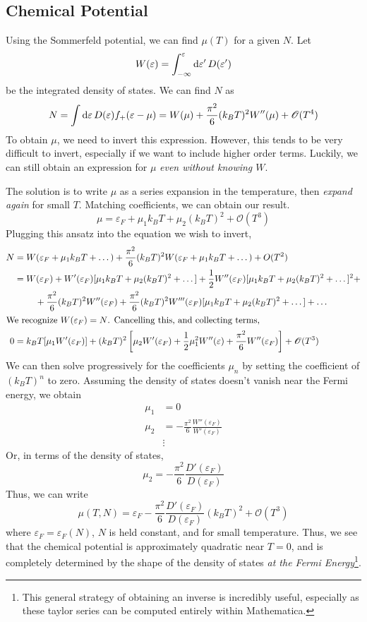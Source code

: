 \subsection{Chemical Potential}
Using the Sommerfeld potential, we can find \(\mu(T)\) for a given \(N\). Let
\[W(\varepsilon) = \int_{-\infty}^\varepsilon \d{\varepsilon'}D(\varepsilon')\]
be the integrated density of states. We can find \(N\) as
\[N = \int\d{\varepsilon}D(\varepsilon)f_+(\varepsilon-\mu) = W(\mu) + \frac{\pi^2}{6}(k_BT)^2W''(\mu)+\mathscr{O}(T^4)\]
To obtain \(\mu\), we need to invert this expression. However, this tends to be very difficult to invert, especially if we want to include higher order terms. Luckily, we can still obtain an expression for \(\mu\) \emph{even without knowing \(W\)}.

The solution is to write \(\mu\) as a series expansion in the temperature, then \emph{expand again} for small \(T\). Matching coefficients, we can obtain our result. 
\[\mu = \varepsilon_F + \mu_1 k_BT + \mu_2 (k_BT)^2 + \mathscr{O}(T^3)\]
Plugging this ansatz into the equation we wish to invert, \hfuzz=1cm
\begin{align*}
	N&= W(\varepsilon_F+\mu_1k_BT+\dots)+\frac{\pi^2}{6}(k_BT)^2W(\varepsilon_F+\mu_1k_BT+\dots)+O(T^2)\\
	 &=W(\varepsilon_F) + W'(\varepsilon_F)[\mu_1k_BT+\mu_2(k_BT)^2+\dots] + \frac{1}{2}W''(\varepsilon_F)[\mu_1k_BT+\mu_2(k_BT)^2+\dots]^2+\\
	 &\hphantom{===}+\frac{\pi^2}{6}(k_BT)^2W''(\varepsilon_F) +\frac{\pi^2}{6}(k_BT)^2W'''(\varepsilon_F)[\mu_1k_BT+\mu_2(k_BT)^2+\dots]+\dots\\
	 \intertext{We recognize \(W(\varepsilon_F)=N\). Cancelling this, and collecting terms,}
	0&=k_BT[\mu_1 W'(\varepsilon_F)]+(k_BT)^2\left[\mu_2 W'(\varepsilon_F)+\frac{1}{2}\mu_1^2W''(\varepsilon)+\frac{\pi^2}{6}W''(\varepsilon_F)\right]+\mathscr{O}(T^3)
\end{align*}
We can then solve progressively for the coefficients \(\mu_n\) by setting the coefficient of \((k_BT)^n\) to zero. Assuming the density of states doesn't vanish near the Fermi energy, we obtain
\begin{align*}
	\mu_1 &= 0\\
	\mu_2 &= -\frac{\pi^2}{6}\frac{W''(\varepsilon_F)}{W'(\varepsilon_F)}\\
	      &\vdots
\end{align*}
Or, in terms of the density of states,
\[\mu_2 = -\frac{\pi^2}{6}\frac{D'(\varepsilon_F)}{D(\varepsilon_F)}\]
Thus, we can write
\begin{equation}
	\mu(T,N) = \varepsilon_F - \frac{\pi^2}{6}\frac{D'(\varepsilon_F)}{D(\varepsilon_F)}(k_BT)^2+\mathscr{O}(T^3)
\end{equation}
where \(\varepsilon_F = \varepsilon_F(N)\), \(N\) is held constant, and for small temperature. Thus, we see that the chemical potential is approximately quadratic near \(T=0\), and is completely determined by the shape of the density of states \emph{at the Fermi Energy}\footnote{This general strategy of obtaining an inverse is incredibly useful, especially as these taylor series can be computed entirely within Mathematica.}.

